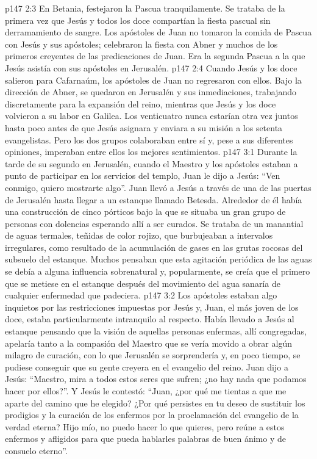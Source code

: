 \vs p147 2:3 En Betania, festejaron la Pascua tranquilamente. Se trataba de la primera vez que Jesús y todos los doce compartían la fiesta pascual sin derramamiento de sangre. Los apóstoles de Juan no tomaron la comida de Pascua con Jesús y sus apóstoles; celebraron la fiesta con Abner y muchos de los primeros creyentes de las predicaciones de Juan. Era la segunda Pascua a la que Jesús asistía con sus apóstoles en Jerusalén.
\vs p147 2:4 Cuando Jesús y los doce salieron para Cafarnaúm, los apóstoles de Juan no regresaron con ellos. Bajo la dirección de Abner, se quedaron en Jerusalén y sus inmediaciones, trabajando discretamente para la expansión del reino, mientras que Jesús y los doce volvieron a su labor en Galilea. Los venticuatro nunca estarían otra vez juntos hasta poco antes de que Jesús asignara y enviara a su misión a los setenta evangelistas. Pero los dos grupos colaboraban entre sí y, pese a sus diferentes opiniones, imperaban entre ellos los mejores sentimientos.
\vs p147 3:1 Durante la tarde de su segundo  en Jerusalén, cuando el Maestro y los apóstoles estaban a punto de participar en los servicios del templo, Juan le dijo a Jesús: “Ven conmigo, quiero mostrarte algo”. Juan llevó a Jesús a través de una de las puertas de Jerusalén hasta llegar a un estanque llamado Betesda. Alrededor de él había una construcción de cinco pórticos bajo la que se situaba un gran grupo de personas con dolencias esperando allí a ser curados. Se trataba de un manantial de aguas termales, teñidas de color rojizo, que burbujeaban a intervalos irregulares, como resultado de la acumulación de gases en las grutas rocosas del subsuelo del estanque. Muchos pensaban que esta agitación periódica de las aguas se debía a alguna influencia sobrenatural y, popularmente, se creía que el primero que se metiese en el estanque después del movimiento del agua sanaría de cualquier enfermedad que padeciera.
\vs p147 3:2 Los apóstoles estaban algo inquietos por las restricciones impuestas por Jesús y, Juan, el más joven de los doce, estaba particularmente intranquilo al respecto. Había llevado a Jesús al estanque pensando que la visión de aquellas personas enfermas, allí congregadas, apelaría tanto a la compasión del Maestro que se vería movido a obrar algún milagro de curación, con lo que Jerusalén se sorprendería y, en poco tiempo, se pudiese conseguir que su gente creyera en el evangelio del reino. Juan dijo a Jesús: “Maestro, mira a todos estos seres que sufren; ¿no hay nada que podamos hacer por ellos?”. Y Jesús le contestó: “Juan, ¿por qué me tientas a que me aparte del camino que he elegido? ¿Por qué persistes en tu deseo de sustituir los prodigios y la curación de los enfermos por la proclamación del evangelio de la verdad eterna? Hijo mío, no puedo hacer lo que quieres, pero reúne a estos enfermos y afligidos para que pueda hablarles palabras de buen ánimo y de consuelo eterno”.

